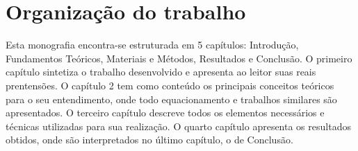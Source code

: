 \section{Organização do trabalho}

Esta monografia encontra-se estruturada em 5 capítulos: Introdução, Fundamentos Teóricos, Materiais e Métodos, Resultados e Conclusão. O primeiro capítulo sintetiza o trabalho desenvolvido e apresenta ao leitor suas reais prentensões. O capítulo 2 tem como conteúdo os principais conceitos teóricos para o seu entendimento, onde todo equacionamento e trabalhos similares são apresentados. O terceiro capítulo descreve todos os elementos necessários e técnicas utilizadas para sua realização. O quarto capítulo apresenta os resultados obtidos, onde são interpretados no último capítulo, o de Conclusão.